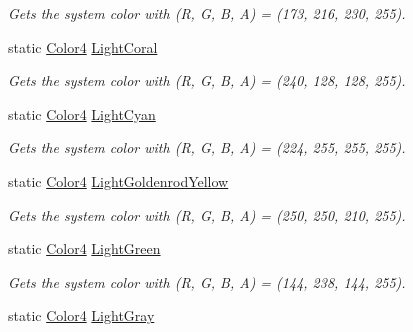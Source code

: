 \begin{DoxyCompactItemize}
\begin{DoxyCompactList}\small\item\em Gets the system color with (R, G, B, A) = (173, 216, 230, 255). \end{DoxyCompactList}\item 
static \hyperlink{struct_open_t_k_1_1_graphics_1_1_color4}{Color4} \hyperlink{struct_open_t_k_1_1_graphics_1_1_color4_a3cea5d4c348f9f95f4460590aff13f4f}{Light\-Coral}
\begin{DoxyCompactList}\small\item\em Gets the system color with (R, G, B, A) = (240, 128, 128, 255). \end{DoxyCompactList}\item 
static \hyperlink{struct_open_t_k_1_1_graphics_1_1_color4}{Color4} \hyperlink{struct_open_t_k_1_1_graphics_1_1_color4_a03338920bc9c62cf4de8ae9d30aa20bf}{Light\-Cyan}
\begin{DoxyCompactList}\small\item\em Gets the system color with (R, G, B, A) = (224, 255, 255, 255). \end{DoxyCompactList}\item 
static \hyperlink{struct_open_t_k_1_1_graphics_1_1_color4}{Color4} \hyperlink{struct_open_t_k_1_1_graphics_1_1_color4_a882b74746f33c19061ecc7ed2a433362}{Light\-Goldenrod\-Yellow}
\begin{DoxyCompactList}\small\item\em Gets the system color with (R, G, B, A) = (250, 250, 210, 255). \end{DoxyCompactList}\item 
static \hyperlink{struct_open_t_k_1_1_graphics_1_1_color4}{Color4} \hyperlink{struct_open_t_k_1_1_graphics_1_1_color4_aa5b7c9b6b9f108a40c8adebdfa13af06}{Light\-Green}
\begin{DoxyCompactList}\small\item\em Gets the system color with (R, G, B, A) = (144, 238, 144, 255). \end{DoxyCompactList}\item 
static \hyperlink{struct_open_t_k_1_1_graphics_1_1_color4}{Color4} \hyperlink{struct_open_t_k_1_1_graphics_1_1_color4_a6bc33cff75dbed4d40a4ce28caa85c4b}{Light\-Gray}

\end{DoxyCompactItemize}
